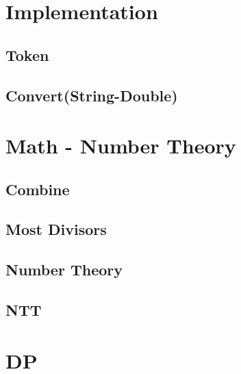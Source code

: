 \section{Implementation}
\subsection{Token}
\raggedbottom
\subsection{Convert(String-Double)}
\raggedbottom
\hrulefill


\section{Math - Number Theory}
\subsection{Combine}
\raggedbottom
\subsection{Most Divisors}
\raggedbottom
\subsection{Number Theory}
\raggedbottom
\subsection{NTT}
\raggedbottom
\hrulefill


\section{DP}
